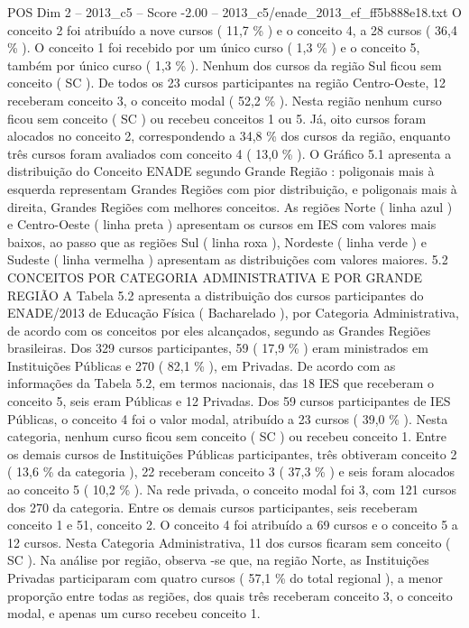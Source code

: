 \begin{textsample}{POS Dim 2 – 2013\_c5 – Score -2.00 – 2013\_c5/enade\_2013\_ef\_ff5b888e18.txt}
O conceito 2 foi atribuído a nove cursos ( 11,7 \% ) e o conceito 4, a 28 cursos ( 36,4 \% ).
O conceito 1 foi recebido por um único curso ( 1,3 \% ) e o conceito 5, também por único curso ( 1,3 \% ).
Nenhum dos cursos da região Sul ficou sem conceito ( SC ).
De todos os 23 cursos participantes na região Centro-Oeste, 12 receberam conceito 3, o conceito modal ( 52,2 \% ).
Nesta região nenhum curso ficou sem conceito ( SC ) ou recebeu conceitos 1 ou 5.
Já, oito cursos foram alocados no conceito 2, correspondendo a 34,8 \% dos cursos da região, enquanto três cursos foram avaliados com conceito 4 ( 13,0 \% ).
O Gráfico 5.1 apresenta a distribuição do Conceito ENADE segundo Grande Região : poligonais mais à esquerda representam Grandes Regiões com pior distribuição, e poligonais mais à direita, Grandes Regiões com melhores conceitos.
As regiões Norte ( linha azul ) e Centro-Oeste ( linha preta ) apresentam os cursos em IES com valores mais baixos, ao passo que as regiões Sul ( linha roxa ), Nordeste ( linha verde ) e Sudeste ( linha vermelha ) apresentam as distribuições com valores maiores. 5.2 CONCEITOS POR CATEGORIA ADMINISTRATIVA E POR GRANDE REGIÃO A Tabela 5.2 apresenta a distribuição dos cursos participantes do ENADE/2013 de Educação Física ( Bacharelado ), por Categoria Administrativa, de acordo com os conceitos por eles alcançados, segundo as Grandes Regiões brasileiras.
Dos 329 cursos participantes, 59 ( 17,9 \% ) eram ministrados em Instituições Públicas e 270 ( 82,1 \% ), em Privadas.
De acordo com as informações da Tabela 5.2, em termos nacionais, das 18 IES que receberam o conceito 5, seis eram Públicas e 12 Privadas.
Dos 59 cursos participantes de IES Públicas, o conceito 4 foi o valor modal, atribuído a 23 cursos ( 39,0 \% ).
Nesta categoria, nenhum curso ficou sem conceito ( SC ) ou recebeu conceito 1.
Entre os demais cursos de Instituições Públicas participantes, três obtiveram conceito 2 ( 13,6 \% da categoria ), 22 receberam conceito 3 ( 37,3 \% ) e seis foram alocados ao conceito 5 ( 10,2 \% ).
Na rede privada, o conceito modal foi 3, com 121 cursos dos 270 da categoria.
Entre os demais cursos participantes, seis receberam conceito 1 e 51, conceito 2.
O conceito 4 foi atribuído a 69 cursos e o conceito 5 a 12 cursos.
Nesta Categoria Administrativa, 11 dos cursos ficaram sem conceito ( SC ).
Na análise por região, observa -se que, na região Norte, as Instituições Privadas participaram com quatro cursos ( 57,1 \% do total regional ), a menor proporção entre todas as regiões, dos quais três receberam conceito 3, o conceito modal, e apenas um curso recebeu conceito 1.

\end{textsample}
